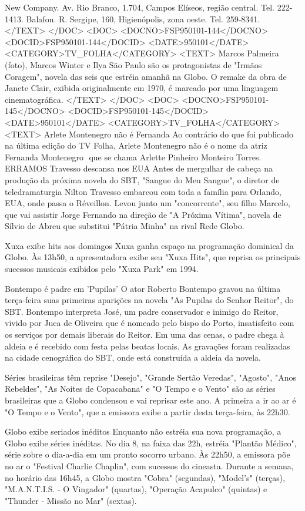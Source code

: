 New Company. Av. Rio Branco, 1.704, Campos Elíseos, região central. Tel. 222-1413. Balafon. R. Sergipe, 160, Higienópolis, zona oeste. Tel. 259-8341.
</TEXT>
</DOC>
<DOC>
<DOCNO>FSP950101-144</DOCNO>
<DOCID>FSP950101-144</DOCID>
<DATE>950101</DATE>
<CATEGORY>TV_FOLHA</CATEGORY>
<TEXT>
Marcos Palmeira (foto), Marcos Winter e Ilya São Paulo são os protagonistas de "Irmãos Coragem", novela das seis que estréia amanhã na Globo. O remake da obra de Janete Clair, exibida originalmente em 1970, é marcado por uma linguagem cinematográfica.
</TEXT>
</DOC>
<DOC>
<DOCNO>FSP950101-145</DOCNO>
<DOCID>FSP950101-145</DOCID>
<DATE>950101</DATE>
<CATEGORY>TV_FOLHA</CATEGORY>
<TEXT>
Arlete Montenegro não é Fernanda 
Ao contrário do que foi publicado na última edição do TV Folha, Arlete Montenegro não é o nome da atriz Fernanda Montenegro  que se chama Arlette Pinheiro Monteiro Torres. ERRAMOS
Travesso descansa nos EUA 
Antes de mergulhar de cabeça na produção da próxima novela do SBT, "Sangue do Meu Sangue", o diretor de teledramaturgia Nilton Travesso embarcou com toda a família para Orlando, EUA, onde passa o Réveillon. Levou junto um "concorrente", seu filho Marcelo, que vai assistir Jorge Fernando na direção de "A Próxima Vítima", novela de Sílvio de Abreu que substitui "Pátria Minha" na rival Rede Globo.

Xuxa exibe hits aos domingos 
Xuxa ganha espaço na programação dominical da Globo. Às 13h50, a apresentadora exibe seu "Xuxa Hits", que reprisa os principais sucessos musicais exibidos pelo "Xuxa Park" em 1994.

Bontempo é padre em 'Pupilas' 
O ator Roberto Bontempo gravou na última terça-feira suas primeiras aparições na novela "As Pupilas do Senhor Reitor", do SBT. Bontempo interpreta José, um padre conservador e inimigo do Reitor, vivido por Juca de Oliveira que é nomeado pelo bispo do Porto, insatisfeito com os serviços por demais liberais do Reitor. Em uma das cenas, o padre chega à aldeia e é recebido com festa pelas beatas locais. As gravações foram realizadas na cidade cenográfica do SBT, onde está construída a aldeia da novela.

Séries brasileiras têm reprise 
"Desejo", "Grande Sertão Veredas", "Agosto", "Anos Rebeldes", "As Noites de Copacabana" e "O Tempo e o Vento" são as séries brasileiras que a Globo condensou e vai reprisar este ano. A primeira a ir ao ar é "O Tempo e o Vento", que a emissora exibe a partir desta terça-feira, às 22h30.

Globo exibe seriados inéditos 
Enquanto não estréia sua nova programação, a Globo exibe séries inéditas. No dia 8, na faixa das 22h, estréia "Plantão Médico", série sobre o dia-a-dia em um pronto socorro urbano. Às 22h50, a emissora põe no ar o "Festival Charlie Chaplin", com sucessos do cineasta. Durante a semana, no horário das 16h45, a Globo mostra "Cobra" (segundas), "Model's" (terças), "M.A.N.T.I.S. - O Vingador" (quartas), "Operação Acapulco" (quintas) e "Thunder - Missão no Mar" (sextas).

